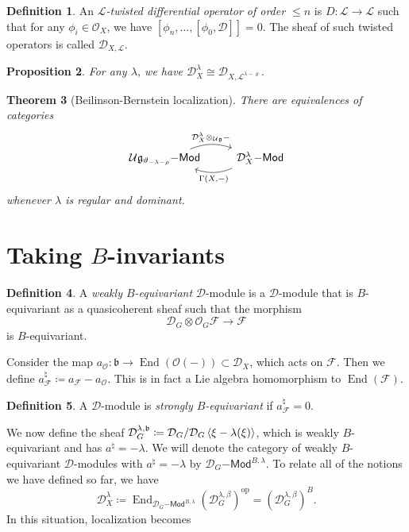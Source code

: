 \documentclass[leqno, openany]{memoir}
\newtheorem{thm}{Theorem}[section]
\newtheorem{prop}[thm]{Proposition}
\theoremstyle{definition}
\newtheorem{defn}[thm]{Definition}
\theoremstyle{remark}
\theoremstyle{plain}
\theoremstyle{definition}
\theoremstyle{remark}
\newcommand{\U}{\mathcal{U}}
\newcommand{\g}{\mathfrak{g}}
\newcommand{\mc}[1]{\mathcal{#1}}
\newcommand{\mf}[1]{\mathfrak{#1}}
\newcommand{\mr}[1]{\mathrm{#1}}
\newcommand{\ms}[1]{\mathsf{#1}}
\DeclareMathOperator{\End}{End}
\begin{document}
\begin{defn}
    An \textit{$\mc{L}$-twisted differential operator of order $\leq n$} is $D \colon \mc{L} \to \mc{L}$ such that for any $\phi_i \in \mc{O}_X$, we have $[\phi_n, \ldots, [\phi_0, \mc{D}]] = 0$. The sheaf of such twisted operators is called $\mc{D}_{X, \mc{L}}$.
\end{defn}

\begin{prop}
    For any $\lambda$, we have $\mc{D}_X^{\lambda} \cong \mc{D}_{X, \mc{L}^{\lambda -\varrho}}$.
\end{prop}

\begin{thm}[Beilinson-Bernstein localization]
    There are equivalences of categories
    \begin{equation*}
    \begin{tikzcd}
        \U \g_{\vartheta_{-\lambda-\rho}}\ms{-Mod} \ar[bend left=20]{r}{\mc{D}_X^{\lambda} \otimes_{\U \g} -} & \mc{D}_X^{\lambda}\ms{-Mod} \ar[bend left=20]{l}{\Gamma(X, -)}
    \end{tikzcd}
    \end{equation*}
    whenever $\lambda$ is regular and dominant.
\end{thm}

\section{Taking $B$-invariants}

\begin{defn}
    A \textit{weakly $B$-equivariant} $\mc{D}$-module is a $\mc{D}$-module that is $B$-equivariant as a quasicoherent sheaf such that the morphism
    \[ \mc{D}_G \otimes \mc{O}_G \mc{F} \to \mc{F} \]
    is $B$-equivariant.
\end{defn}

Consider the map $a_{\mc{O}} \colon \mf{b} \to \End(\mc{O}(-)) \subset \mc{D}_X$, which acts on $\mc{F}$. Then we define $a_{\mc{F}}^{\natural} \coloneqq a_{\mc{F}} - a_{\mc{O}}$. This is in fact a Lie algebra homomorphism to $\End(\mc{F})$.

\begin{defn}
    A $\mc{D}$-module is \textit{strongly $B$-equivariant} if $a_{\mc{F}}^{\natural} = 0$.
\end{defn}

We now define the sheaf $\mc{D}_G^{\lambda, \mf{b}} \coloneqq \mc{D}_G / \mc{D}_G \ev{\xi -\lambda (\xi)}$, which is weakly $B$-equivariant and has $a^{\natural} = -\lambda$. We will denote the category of weakly $B$-equivariant $\mc{D}$-modules with $a^{\natural} = -\lambda$ by $\mc{D}_G\ms{-Mod}^{B, \lambda}$. To relate all of the notions we have defined so far, we have
\[ \mc{D}_X^{\lambda} \coloneqq \End_{\mc{D}_G \ms{-Mod}^{B, \lambda}}(\mc{D}_G^{\lambda, \beta})^{\mr{op}} = ( \mc{D}_G^{\lambda, \beta} )^B. \]
In this situation, localization becomes
\end{document}
